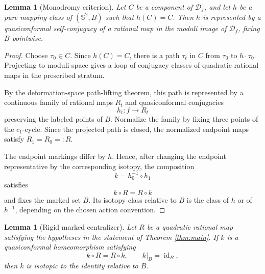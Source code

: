 \documentclass[11pt]{article}
\newcommand{\Sph}{\mathbb S^2}
\newcommand{\D}{\mathcal D}
\newcommand{\id}{\operatorname{id}}
\newtheorem{lemma}[theorem]{Lemma}
\theoremstyle{remark}
\begin{document}
\begin{lemma}[Monodromy criterion]\label{lem:monodromy}
Let \(C\) be a component of \(\D_f\), and let \(h\) be a pure mapping
class of \((\Sph,B)\) such that \(h(C)=C\).  Then \(h\) is represented
by a quasiconformal self-conjugacy of a rational map in the moduli
image of \(\D_f\), fixing \(B\) pointwise.
\end{lemma}

\begin{proof}
Choose \(\tau_0\in C\).  Since \(h(C)=C\), there is a path
\(\tau_t\) in \(C\) from \(\tau_0\) to \(h\cdot\tau_0\).
Projecting to moduli space gives a loop of conjugacy classes of
quadratic rational maps in the prescribed stratum.

By the deformation-space path-lifting theorem, this path is
represented by a continuous family of rational maps \(R_t\) and
quasiconformal conjugacies
\[
h_t:f\longrightarrow R_t
\]
preserving the labeled points of \(B\).  Normalize the family by
fixing three points of the \(c_1\)-cycle.  Since the projected path
is closed, the normalized endpoint maps satisfy \(R_1=R_0=:R\).

The endpoint markings differ by \(h\).  Hence, after changing the
endpoint representative by the corresponding isotopy, the
composition
\[
k=h_0^{-1}\circ h_1
\]
satisfies
\[
k\circ R=R\circ k
\]
and fixes the marked set \(B\).  Its isotopy class relative to \(B\)
is the class of \(h\) or of \(h^{-1}\), depending on the chosen
action convention.
\end{proof}

\begin{lemma}[Rigid marked centralizer]\label{lem:rigid-centralizer}
Let \(R\) be a quadratic rational map satisfying the hypotheses in
the statement of Theorem \ref{thm:main}.  If \(k\) is a
quasiconformal homeomorphism satisfying
\[
k\circ R=R\circ k,
\qquad k|_B=\id_B,
\]
then \(k\) is isotopic to the identity relative to \(B\).
\end{lemma}
\end{document}
